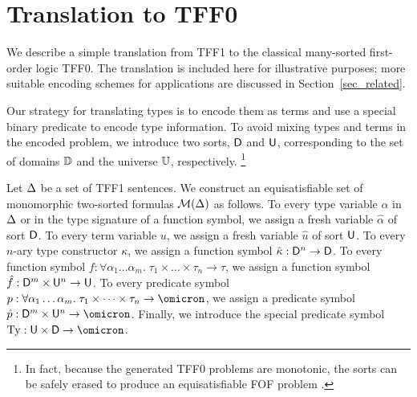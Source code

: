 \section{Translation to TFF0} \label{sec_trans}

We describe a simple translation from TFF1 to the classical many-sorted
first-order logic TFF0.
The translation is included here for illustrative purposes; more suitable
encoding schemes for applications are discussed in
Section~\ref{sec_related}.

\nopagebreak %

Our strategy for translating types is to encode them as terms and
use a special binary predicate to encode type information.
%
To avoid mixing types
and terms in the encoded problem, we introduce two sorts, $\mathsf{D}$ and $\mathsf{U}$,
corresponding to the set of domains $\mathbb{D}$ and the universe $\mathbb{U}$,
respectively.%
\footnote{%
In fact, because the generated TFF0 problems are monotonic, the sorts can
be safely erased to produce an equisatisfiable FOF problem \cite{claessen-et-al-2011}.
}

Let $\mathrm{\Delta}$ be a set of TFF1 sentences.
We construct an equisatisfiable set of monomorphic two-sorted
formulas $\mathcal{M}(\mathrm{\Delta})$ as follows.
%
To every type variable $\alpha$ in $\mathrm{\Delta}$ or in the type signature of a function
symbol, we assign a fresh variable $\hat{\alpha}$ of sort $\mathsf{D}$.
To every term variable $u$, we assign
a fresh variable $\hat{u}$ of sort $\mathsf{U}$.
To every $n$-ary type constructor $\kappa$, we assign
a function symbol $\hat{\kappa} : \mathsf{D}^n \to \mathsf{D}$.
To every function symbol $f : \forall \alpha_1\dots\alpha_m .\; \tau_1 \times \dots \times \tau_n \to \tau$,
we assign a function symbol $\hat{f} : \mathsf{D}^m \times \mathsf{U}^n \to \mathsf{U}$.
To every predicate symbol $p : \forall \alpha_1\dots\alpha_m .\; \tau_1 \times \dots \times \tau_n \to \omicron$,
we assign a predicate symbol $\hat{p} : \typ^m \times \und^n \to \omicron$.
Finally, we introduce the special predicate symbol $\typeof : \und \times \typ \to \omicron$.

